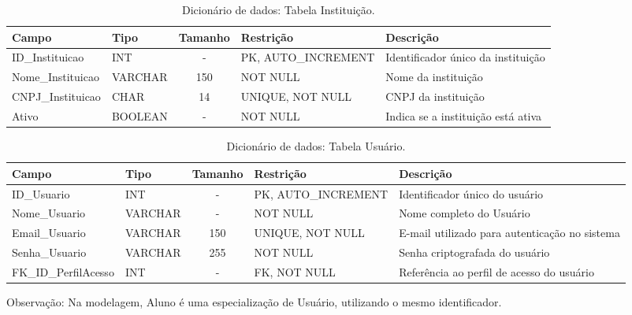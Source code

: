 \begin{table}[H]
    \centering
    \ABNTEXfontereduzida
    \caption[Dicionário de Dados - Tabela Instituição]{Dicionário de dados: Tabela Instituição.}
    \label{tab-tb-instituicao}
    \begin{tabular}{p{3.5cm}|p{2cm}|c|p{3.5cm}|p{4cm}}
    \textbf{Campo} & \textbf{Tipo} & \textbf{Tamanho} & \textbf{Restrição} & \textbf{Descrição} \\
    \hline
    ID\_Instituicao & INT & - & PK, AUTO\_INCREMENT & Identificador único da instituição \\
    \hline
    Nome\_Instituicao & VARCHAR & 150 & NOT NULL & Nome da instituição \\
    \hline
    CNPJ\_Instituicao & CHAR & 14 & UNIQUE, NOT NULL & CNPJ da instituição \\
    \hline
    Ativo & BOOLEAN & - & NOT NULL & Indica se a instituição está ativa \\
    \end{tabular}
\end{table}

\begin{table}[H]
    \centering
    \ABNTEXfontereduzida
    \caption[Dicionário de Dados - Tabela Usuário]{Dicionário de dados: Tabela Usuário.}
    \label{tab-tb-usuario}
    \begin{tabular}{p{3.5cm}|p{2cm}|c|p{3.5cm}|p{4cm}}
    \textbf{Campo} & \textbf{Tipo} & \textbf{Tamanho} & \textbf{Restrição} & \textbf{Descrição} \\
    \hline
    ID\_Usuario & INT & - & PK, AUTO\_INCREMENT & Identificador único do usuário \\
    \hline
    Nome\_Usuario & VARCHAR & - & NOT NULL & Nome completo do Usuário \\
    \hline
    Email\_Usuario & VARCHAR & 150 & UNIQUE, NOT NULL & E-mail utilizado para autenticação no sistema \\
    \hline
    Senha\_Usuario & VARCHAR & 255 & NOT NULL & Senha criptografada do usuário \\
    \hline
    FK\_ID\_PerfilAcesso & INT & - & FK, NOT NULL & Referência ao perfil de acesso do usuário \\
    \end{tabular}
\end{table}

    Observação: Na modelagem, Aluno é uma especialização de Usuário, utilizando o mesmo identificador.

